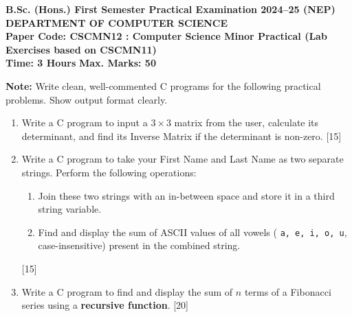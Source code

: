 \documentclass[11pt,a4paper]{article}
\begin{document}
\begin{center}
    {\Large   \textbf{B.Sc. (Hons.) First Semester Practical Examination 2024--25 (NEP)}}\\[4pt]
    {\large   \textbf{DEPARTMENT OF COMPUTER SCIENCE}}\\[4pt]
   \textbf{Paper Code: CSCMN12 : Computer Science Minor Practical (Lab Exercises based on CSCMN11)}\\[6pt]
   \textbf{Time: 3 Hours} \hfill   \textbf{Max. Marks: 50}
\end{center}
\hr




\noindent   \textbf{Note:} Write clean, well-commented C programs for the following practical problems. Show output format clearly.


\begin{enumerate}[label=   \textbf{\arabic*.}]
    \item Write a C program to input a $3  \times 3$ matrix from the user, calculate its determinant, and find its Inverse Matrix if the determinant is non-zero. \hfill [15]
    
    \item Write a C program to take your First Name and Last Name as two separate strings. Perform the following operations:
    
\begin{enumerate}[label=(\alph*)]
        \item Join these two strings with an in-between space and store it in a third string variable.
        \item Find and display the sum of ASCII values of all vowels (   \texttt{a, e, i, o, u}, case-insensitive) present in the combined string.
    \end{enumerate} \hfill [15]
    
    \item Write a C program to find and display the sum of $n$ terms of a Fibonacci series using a   \textbf{recursive function}. \hfill [20]
\end{enumerate}
\end{document}

